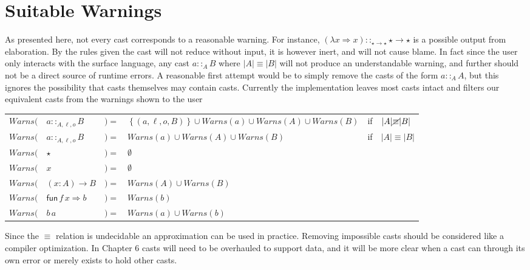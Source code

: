 \section{Suitable Warnings}
 
As presented here, not every cast corresponds to a reasonable warning.
For instance, $\left(\lambda x\Rightarrow x\right)::_{\star\rightarrow\star}\star\rightarrow\star$ is a possible output from elaboration.
By the rules given the cast will not reduce without input, it is however inert, and will not cause blame.
In fact since the user only interacts with the surface language, any cast $a::_{A}B$ where $|A|\equiv|B|$ will not produce an understandable warning, and further should not be a direct source of runtime errors.
A reasonable first attempt would be to simply remove the casts of the form $a::_{A}A$, but this ignores the possibility that casts themselves may contain casts.
Currently the implementation leaves most casts intact and filters our equivalent casts from the warnings shown to the user
 
 
\begin{tabular}{llllll}
$Warns($ & $a::_{A,\ensuremath{\ell},o}B$ & $)=$ & $\left\{ (a,\ensuremath{\ell},o,B)\right\} \cup Warns(a)\cup Warns(A)\cup Warns(B)$ & if & $|A|\cancel{\equiv}|B|$\tabularnewline
$Warns($ & $a::_{A,\ensuremath{\ell},o}B$ & $)=$ & $Warns(a)\cup Warns(A)\cup Warns(B)$ & if & $|A|\equiv|B|$\tabularnewline
$Warns($ & $\star$ & $)=$ & $\emptyset$ &  & \tabularnewline
$Warns($ & $x$ & $)=$ & $\emptyset$ &  & \tabularnewline
$Warns($ & $\left(x:A\right)\rightarrow B$ & $)=$ & $Warns(A)\cup Warns(B)$ &  & \tabularnewline
$Warns($ & $\mathsf{fun}\,f\,x\Rightarrow b$ & $)=$ & $Warns(b)$ &  & \tabularnewline
$Warns($ & $b\,a$ & $)=$ & $Warns(a)\cup Warns(b)$ &  & \tabularnewline
\end{tabular}
 
Since the $\equiv$ relation is undecidable an approximation can be used in practice.
Removing impossible casts should be considered like a compiler optimization.
In Chapter 6 casts will need to be overhauled to support data, and it will be more clear when a cast can through its own error or merely exists to hold other casts.
